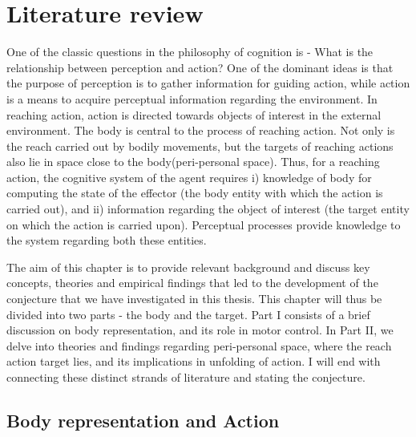 \chapter{Literature review} 
\label{Literature Review} 

One of the classic questions in the philosophy of cognition is - What is the relationship between perception and action? One of the dominant ideas is that the purpose of perception is to gather information for guiding action, while action is a means to acquire perceptual information regarding the environment. In reaching action, action is directed towards objects of interest in the external environment. The body is central to the process of reaching action. Not only is the reach carried out by bodily movements, but the targets of reaching actions also lie in space close to the body(peri-personal space). Thus, for a reaching action, the cognitive system of the agent requires i) knowledge of body for computing the state of the effector (the body entity with which the action is carried out), and ii) information regarding the object of interest (the target entity on which the action is carried upon). Perceptual processes provide knowledge to the system regarding both these entities.

The aim of this chapter is to provide relevant background and discuss key concepts, theories and empirical findings that led to the development of the conjecture that we have investigated in this thesis. This chapter will thus be divided into two parts - the body and the target. Part I consists of a brief discussion on body representation, and its role in motor control. In Part II, we delve into theories and findings regarding peri-personal space, where the reach action target lies, and its implications in unfolding of action. I will end with connecting these distinct strands of literature and stating the conjecture. 


\section{Body representation and Action}

